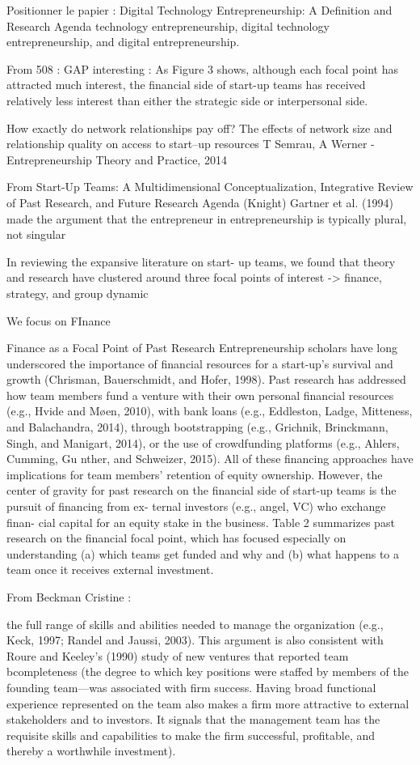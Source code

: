 \documentclass[11pt]{article}
\begin{document}
Positionner le papier :
Digital Technology Entrepreneurship: A Definition and Research Agenda
technology entrepreneurship, digital technology entrepreneurship, and digital entrepreneurship.

From 508 : GAP interesting : As Figure 3 shows, although each focal point has attracted much interest, the financial side of start-up teams has received relatively less interest than either the strategic side or interpersonal side.

How exactly do network relationships pay off? The effects of network size and relationship quality on access to start–up resources
T Semrau, A Werner - Entrepreneurship Theory and Practice, 2014

From Start-Up Teams: A Multidimensional Conceptualization, Integrative Review of Past Research, and Future Research Agenda (Knight)
Gartner et al. (1994) made the argument that the entrepreneur in entrepreneurship is typically plural, not singular

In reviewing the expansive literature on start- up teams, we found that theory and research have clustered around three focal points of interest -> finance, strategy, and group dynamic

We focus on FInance

Finance as a Focal Point of Past Research
Entrepreneurship scholars have long underscored the importance of financial resources for a start-up’s survival and growth (Chrisman, Bauerschmidt, and Hofer, 1998). Past research has addressed how team members fund a venture with their own personal financial resources (e.g., Hvide and Møen, 2010), with bank loans (e.g., Eddleston, Ladge, Mitteness, and Balachandra, 2014), through bootstrapping (e.g., Grichnik, Brinckmann, Singh, and Manigart, 2014), or the use of crowdfunding platforms (e.g., Ahlers, Cumming, Gu nther, and Schweizer, 2015). All of these financing approaches have implications for team members’ retention of equity ownership. However, the center of gravity for past research on the financial side of start-up teams is the pursuit of financing from ex- ternal investors (e.g., angel, VC) who exchange finan- cial capital for an equity stake in the business. Table 2 summarizes past research on the financial focal point, which has focused especially on understanding (a) which teams get funded and why and (b) what happens to a team once it receives external investment.

From Beckman Cristine :

the full range of skills and abilities needed to manage the organization (e.g., Keck, 1997; Randel and Jaussi, 2003). This argument is also consistent with Roure and Keeley’s (1990) study of new ventures that reported team bcompleteness (the degree to which key positions were staffed by members of the founding team—was associated with firm success. Having broad functional experience represented on the team also makes a firm more attractive to external stakeholders and to investors. It signals that the management team has the requisite skills and capabilities to make the firm successful, profitable, and thereby a worthwhile investment).
\end{document}
